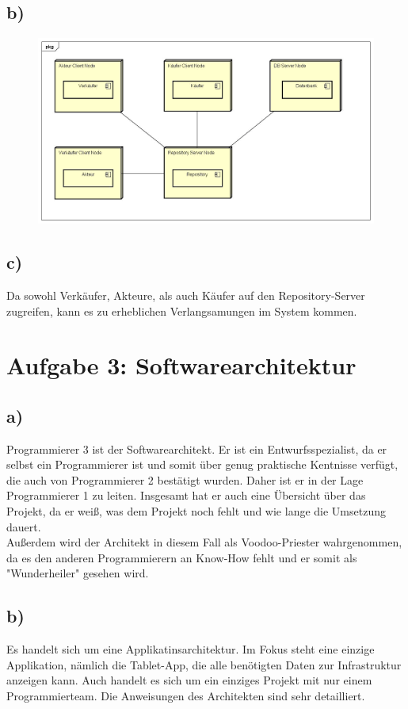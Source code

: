\documentclass[12pt,pdftex,a4paper]{article}
\begin{document}
\newpage
\subsection*{b)}
\begin{figure}[htbp]
\centering
\includegraphics[width=1\textwidth]{b.png}
\end{figure}
\subsection*{c)}
Da sowohl Verkäufer, Akteure, als auch Käufer auf den Repository-Server zugreifen, kann es zu erheblichen Verlangsamungen im System kommen.


\section*{Aufgabe 3: Softwarearchitektur}
\subsection*{a)} 
Programmierer 3 ist der Softwarearchitekt. Er ist ein Entwurfsspezialist, da er selbst ein Programmierer ist und somit über genug praktische Kentnisse verfügt, die auch von Programmierer 2 bestätigt wurden. Daher ist er in der Lage Programmierer 1 zu leiten. Insgesamt hat er auch eine Übersicht über das Projekt, da er weiß, was dem Projekt noch fehlt und wie lange die Umsetzung dauert.\\
Außerdem wird der Architekt in diesem Fall als Voodoo-Priester wahrgenommen, da es den anderen Programmierern an Know-How fehlt und er somit als "Wunderheiler" gesehen wird.
\subsection*{b)}
Es handelt sich um eine Applikatinsarchitektur. Im Fokus steht eine einzige Applikation, nämlich die Tablet-App, die alle benötigten Daten zur Infrastruktur anzeigen kann. Auch handelt es sich um ein einziges Projekt mit nur einem Programmierteam. Die Anweisungen des Architekten sind sehr detailliert.
\newpage
\end{document}
